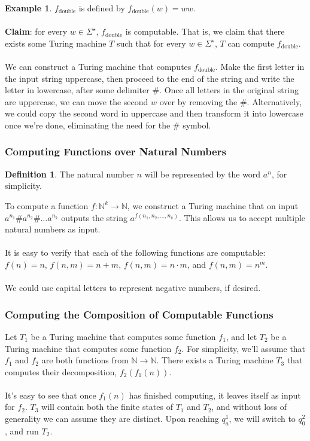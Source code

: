 \documentclass[]{article}
\theoremstyle{definition}
\newtheorem*{defn}{Definition}
\newtheorem{ex}{Example}[section]
\begin{document}
      \begin{ex}
        $f_\text{double}$ is defined by $f_\text{double}(w) = ww$.
        \\ \\
        \textbf{Claim}: for every $w \in \Sigma^\star$, $f_\text{double}$ is computable. That is, we claim that there exists some Turing machine $T$ such that for every $w \in \Sigma^\star$, $T$ can compute $f_\text{double}$.
        \\ \\
        We can construct a Turing machine that computes $f_\text{double}$. Make the first letter in the input string uppercase, then proceed to the end of the string and write the letter in lowercase, after some delimiter \#. Once all letters in the original string are uppercase, we can move the second $w$ over by removing the \#. Alternatively, we could copy the second word in uppercase and then transform it into lowercase once we're done, eliminating the need for the \# symbol.
      \end{ex}

      \subsubsection{Computing Functions over Natural Numbers}
        \begin{defn}
          The natural number $n$ will be represented by the word $a^n$, for simplicity.
        \end{defn}

        To compute a function $f : \mathbb{N}^k \to \mathbb{N}$, we construct a Turing machine that on input $a^{n_1} \# a^{n_2} \# \ldots a^{n_k}$ outputs the string $a^{f(n_1, n_2, \ldots, n_k)}$. This allows us to accept multiple natural numbers as input.
        \\ \\
        It is easy to verify that each of the following functions are computable: $f(n) = n$, $f(n, m) = n + m$, $f(n, m) = n \cdot m$, and $f(n, m) = n^m$.
        \\ \\
        We could use capital letters to represent negative numbers, if desired.

      \subsubsection{Computing the Composition of Computable Functions}
        Let $T_1$ be a Turing machine that computes some function $f_1$, and let $T_2$ be a Turing machine that computes some function $f_2$. For simplicity, we'll assume that $f_1$ and $f_2$ are both functions from $\mathbb{N} \to \mathbb{N}$. There exists a Turing machine $T_3$ that computes their decomposition, $f_2(f_1(n))$.
        \\ \\
        It's easy to see that once $f_1(n)$ has finished computing, it leaves itself as input for $f_2$. $T_3$ will contain both the finite states of $T_1$ and $T_2$, and without loss of generality we can assume they are distinct. Upon reaching $q_a^1$, we will switch to $q_0^2$, and run $T_2$.
\end{document}
